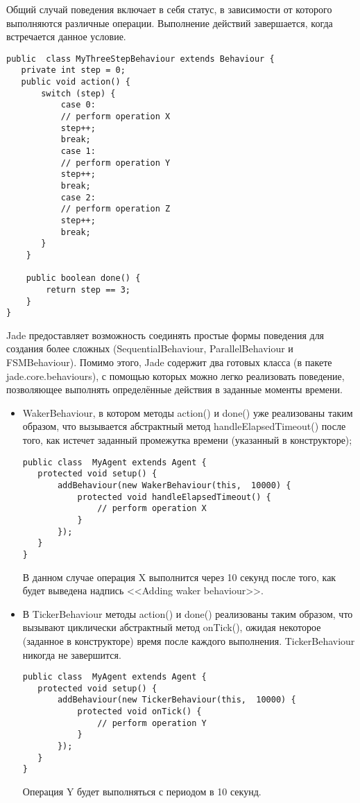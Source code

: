 Общий случай поведения включает в себя статус, в зависимости от которого выполняются различные операции. Выполнение действий завершается, когда встречается данное условие.
\begin{lstlisting}
public  class MyThreeStepBehaviour extends Behaviour { 
   private int step = 0; 
   public void action() { 
       switch (step) { 
           case 0: 
           // perform operation X 
           step++; 
           break; 
           case 1: 
           // perform operation Y 
           step++; 
           break; 
           case 2: 
           // perform operation Z 
           step++; 
           break; 
       } 
    } 

    public boolean done() { 
        return step == 3; 
    } 
}
\end{lstlisting}
Jade предоставляет возможность соединять простые формы поведения для создания более сложных (SequentialBehaviour, ParallelBehaviour и FSMBehaviour). Помимо этого, Jade содержит два готовых класса (в пакете jade.core.behaviours), с помощью которых можно легко реализовать поведение, позволяющее выполнять определённые действия в заданные моменты времени.
\begin{itemize}
\item WakerBehaviour, в котором методы action() и done() уже реализованы таким образом, что вызывается абстрактный метод handleElapsedTimeout() после того, как истечет заданный промежутка времени (указанный в конструкторе);
\begin{lstlisting}
public class  MyAgent extends Agent { 
   protected void setup() { 
       addBehaviour(new WakerBehaviour(this,  10000) { 
           protected void handleElapsedTimeout() { 
               // perform operation X 
           } 
       }); 
   } 
}
\end{lstlisting}
В данном случае операция X выполнится через 10 секунд после того, как будет выведена надпись <<Adding waker behaviour>>.
\item В TickerBehaviour методы action() и done() реализованы таким образом, что вызывают циклически абстрактный метод onTick(), ожидая некоторое (заданное в конструкторе) время после каждого выполнения. TickerBehaviour никогда не завершится. 
\begin{lstlisting}
public class  MyAgent extends Agent { 
   protected void setup() { 
       addBehaviour(new TickerBehaviour(this,  10000) { 
           protected void onTick() { 
               // perform operation Y 
           } 
       }); 
   } 
}
\end{lstlisting}
Операция Y будет выполняться с периодом в 10 секунд.
\end{itemize}

